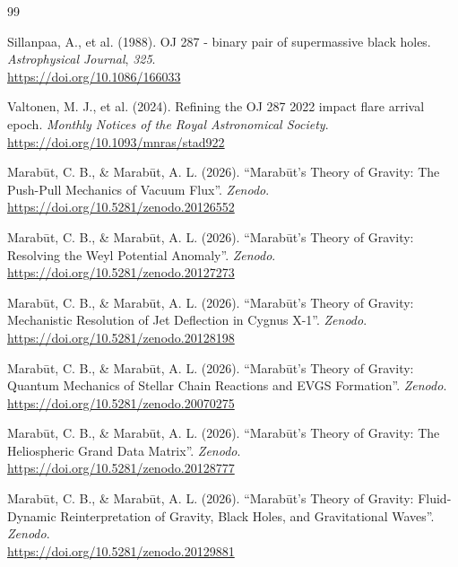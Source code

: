 \documentclass[11pt, a4paper]{article}
\begin{document}
\clearpage
\begin{thebibliography}{99}

  Sillanpaa, A., et al. (1988). OJ 287 - binary pair of supermassive black holes. \textit{Astrophysical Journal}, \textit{325}. \\ \url{https://doi.org/10.1086/166033}

  Valtonen, M. J., et al. (2024). Refining the OJ 287 2022 impact flare arrival epoch. \textit{Monthly Notices of the Royal Astronomical Society}. \\ \url{https://doi.org/10.1093/mnras/stad922}

  Marab\={u}t, C. B., \& Marab\={u}t, A. L. (2026). ``Marab\={u}t's Theory of Gravity: The Push-Pull Mechanics of Vacuum Flux''. \textit{Zenodo}. \\ \url{https://doi.org/10.5281/zenodo.20126552}

  Marab\={u}t, C. B., \& Marab\={u}t, A. L. (2026). ``Marab\={u}t's Theory of Gravity: Resolving the Weyl Potential Anomaly''. \textit{Zenodo}. \\ \url{https://doi.org/10.5281/zenodo.20127273}

  Marab\={u}t, C. B., \& Marab\={u}t, A. L. (2026). ``Marab\={u}t's Theory of Gravity: Mechanistic Resolution of Jet Deflection in Cygnus X-1''. \textit{Zenodo}. \\ \url{https://doi.org/10.5281/zenodo.20128198}

  Marab\={u}t, C. B., \& Marab\={u}t, A. L. (2026). ``Marab\={u}t's Theory of Gravity: Quantum Mechanics of Stellar Chain Reactions and EVGS Formation''. \textit{Zenodo}. \\ \url{https://doi.org/10.5281/zenodo.20070275}

  Marab\={u}t, C. B., \& Marab\={u}t, A. L. (2026). ``Marab\={u}t's Theory of Gravity: The Heliospheric Grand Data Matrix''. \textit{Zenodo}. \\ \url{https://doi.org/10.5281/zenodo.20128777}

  Marab\={u}t, C. B., \& Marab\={u}t, A. L. (2026). ``Marab\={u}t's Theory of Gravity: Fluid-Dynamic Reinterpretation of Gravity, Black Holes, and Gravitational Waves''. \textit{Zenodo}. \\ \url{https://doi.org/10.5281/zenodo.20129881}


\end{thebibliography}
\end{document}
